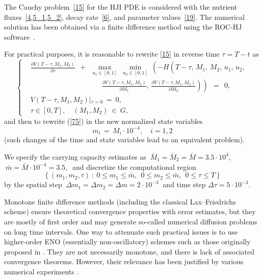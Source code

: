 \documentclass[a4paper,12pt]{article}
\begin{document}
The Cauchy problem~\cref{15} for the HJI PDE is considered with the nutrient fluxes~\cref{4,5_1,5_2}, decay rate~\cref{6}, and
parameter values~\cref{19}. The numerical solution has been obtained via a finite difference method
\cite{FlemingSoner2006,OsherShu1991,BotkinHoffmannTurova2011,BokanForcadelZidani2010} using the ROC-HJ software~\cite{ROCHJ2019}.

For practical purposes, it is reasonable to rewrite \cref{15} in reverse time $ \tau = T - t $ as
\begin{equation}
\left\{ \begin{aligned}
& \frac{\partial V(T - \tau, M_1, M_2)}{\partial \tau} \:\: + \:\: \max_{u_1 \in [0, 1]} \: \min_{u_2 \in [0, 1]} \:
\left( -H \left( T - \tau, \, M_1, \, M_2, \, u_1, \, u_2,  {}^{{}^{{}^{{}^{{}^{}}}}} \right. \right. \\
& \qquad\qquad\qquad\qquad\qquad
\left. \left. \frac{\partial V(T - \tau, M_1, M_2)}{\partial M_1}, \,
\frac{\partial V(T - \tau, M_1, M_2)}{\partial M_2} \right) \right) \:\: = \:\: 0, \\
& V(T - \tau, M_1, M_2) \left|_{\tau = 0} \right. \: = \: 0, \\
& \tau \in [0, T], \quad (M_1, M_2) \: \in \: G,
\end{aligned} \right.  \label{75}
\end{equation}
and then to rewrite (\ref{75}) in the new normalized state variables
\begin{equation}
m_i \, = \, M_i \cdot 10^{-4}, \quad i = 1,2  \label{75_1}
\end{equation}
(such changes of the time and state variables lead to an equivalent problem).

We specify the carrying capacity estimates as $ \: \bar{M}_1 = \bar{M}_2 = \bar{M} = 3.5 \cdot 10^4 $,
$ \: \bar{m} = \bar{M} \cdot 10^{-4} = 3.5, \: $ and discretize the computational region
$$
\left\{ (m_1, m_2, \tau) \: \colon \: 0 \leqslant m_1 \leqslant \bar{m}, \:\: 0 \leqslant m_2 \leqslant \bar{m}, \:\:
0 \leqslant \tau \leqslant T \right\}
$$
by the spatial step $ \: \Delta m_1 = \Delta m_2 = \Delta m = 2 \cdot 10^{-3} \: $ and time step $ \Delta \tau = 5 \cdot 10^{-3} $.

Monotone finite difference methods (including the classical Lax--Friedrichs scheme) ensure theoretical convergence properties with
error estimates, but they are mostly of first order and may generate so-called numerical diffusion problems on long time intervals.
One way to attenuate such practical issues is to use higher-order ENO (essentially non-oscillatory) schemes such as those originally
proposed in \cite{OsherShu1991}. They are not necessarily monotone, and there is lack of associated convergence theorems. However,
their relevance has been justified by various numerical experiments \cite{OsherShu1991,BokanForcadelZidani2010}.
\end{document}
